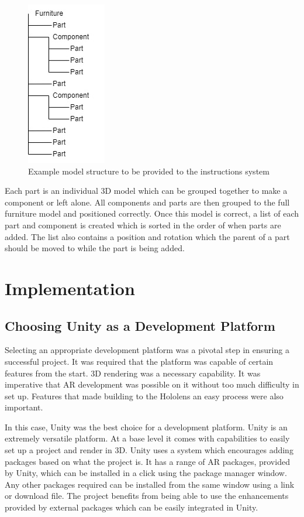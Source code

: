 \documentclass{l4proj}
\begin{document}
\begin{figure}[hbt!]
    \centering
    \includegraphics[width=0.2\linewidth]{dissertation//images/modelFileStructure .jpg}
    \caption{Example model structure to be provided to the instructions system}
    \label{fig:modelStruct}
\end{figure}

Each part is an individual 3D model which can be grouped together to make a component or left alone. All components and parts are then grouped to the full furniture model and positioned correctly. Once this model is correct, a list of each part and component is created which is sorted in the order of when parts are added. The list also contains a position and rotation which the parent of a part should be moved to while the part is being added.


\chapter{Implementation}
\label{chap:implementation}

\section{Choosing Unity as a Development Platform}

Selecting an appropriate development platform was a pivotal step in ensuring a successful project. It was required that the platform was capable of certain features from the start. 3D rendering was a necessary capability. It was imperative that AR development was possible on it without too much difficulty in set up. Features that made building to the Hololens an easy process were also important.

In this case, Unity was the best choice for a development platform. Unity is an extremely versatile platform. At a base level it comes with capabilities to easily set up a project and render in 3D. Unity uses a system which encourages adding packages based on what the project is. It has a range of AR packages, provided by Unity, which can be installed in a click using the package manager window. Any other packages required can be installed from the same window using a link or download file. The project benefits from being able to use the enhancements provided by external packages which can be easily integrated in Unity.
\end{document}
